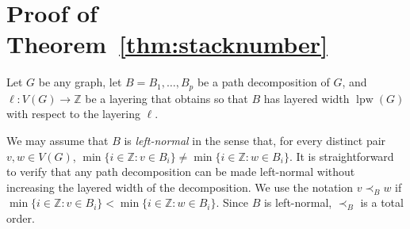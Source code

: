 \documentclass{jgaa-art}
\newcommand{\Z}{\mathbb{Z}}
\newtheorem{thm}{Theorem}{\bfseries}{\itshape}
\newcommand{\thmref}[1]{Theorem~\ref{thm:#1}}
\DeclareMathOperator{\lpw}{lpw}
\begin{document}
%
%


\section{Proof of \thmref{stacknumber}}

Let $G$ be any graph, let $B=B_1,\ldots,B_p$ be a path decomposition of $G$, and $\ell:V(G)\to\Z$ be a layering that obtains so that $B$ has layered width $\lpw(G)$ with respect to the layering $\ell$.

We may assume that $B$ is \emph{left-normal} in the sense that, for every distinct pair $v,w\in V(G)$, $\min\{i\in\Z : v\in B_i\} \neq \min\{i\in\Z:w\in B_i\}$. It is straightforward to verify that any path decomposition can be made left-normal without increasing the layered width of the decomposition.
We use the notation $v\prec_B w$ if $\min\{i\in\Z : v\in B_i\} < \min\{i\in\Z:w\in B_i\}$.  Since $B$ is left-normal, $\prec_B$ is a total order.
\end{document}
